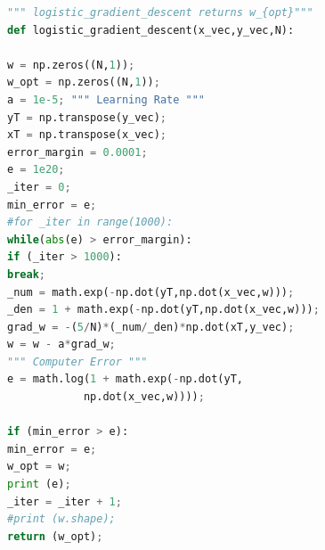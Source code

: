 \documentclass[journal]{IEEEtran}
\begin{document}
\begin{lstlisting}[language=Python, caption= Logistic Gradient Descent]
""" logistic_gradient_descent returns w_{opt}"""
def logistic_gradient_descent(x_vec,y_vec,N):

w = np.zeros((N,1));
w_opt = np.zeros((N,1));
a = 1e-5; """ Learning Rate """
yT = np.transpose(y_vec);
xT = np.transpose(x_vec);
error_margin = 0.0001;
e = 1e20;
_iter = 0;
min_error = e;
#for _iter in range(1000):
while(abs(e) > error_margin):
if (_iter > 1000):
break;
_num = math.exp(-np.dot(yT,np.dot(x_vec,w)));
_den = 1 + math.exp(-np.dot(yT,np.dot(x_vec,w)));
grad_w = -(5/N)*(_num/_den)*np.dot(xT,y_vec);
w = w - a*grad_w;
""" Computer Error """
e = math.log(1 + math.exp(-np.dot(yT,
			np.dot(x_vec,w))));

if (min_error > e):
min_error = e;
w_opt = w;
print (e);
_iter = _iter + 1;
#print (w.shape);
return (w_opt);
\end{lstlisting}
\end{document}
